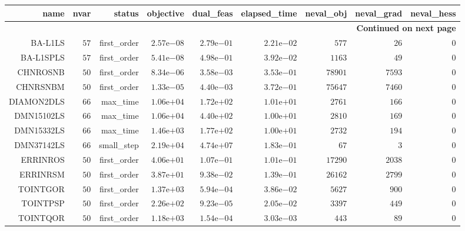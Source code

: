 \begin{longtable}{rrrrrrrrr}
\hline
name & nvar & status & objective & dual\_feas & elapsed\_time & neval\_obj & neval\_grad & neval\_hess \\\hline
\endhead
\hline
\multicolumn{9}{r}{{\bfseries Continued on next page}}\\
\hline
\endfoot
\endlastfoot
BA-L1LS & \(    57\) & first\_order & \( 2.57\)e\(-08\) & \( 2.79\)e\(-01\) & \( 2.21\)e\(-02\) & \(   577\) & \(    26\) & \(     0\) \\
BA-L1SPLS & \(    57\) & first\_order & \( 5.41\)e\(-08\) & \( 4.98\)e\(-01\) & \( 3.92\)e\(-02\) & \(  1163\) & \(    49\) & \(     0\) \\
CHNROSNB & \(    50\) & first\_order & \( 8.34\)e\(-06\) & \( 3.58\)e\(-03\) & \( 3.53\)e\(-01\) & \( 78901\) & \(  7593\) & \(     0\) \\
CHNRSNBM & \(    50\) & first\_order & \( 1.33\)e\(-05\) & \( 4.40\)e\(-03\) & \( 3.72\)e\(-01\) & \( 75647\) & \(  7460\) & \(     0\) \\
DIAMON2DLS & \(    66\) & max\_time & \( 1.06\)e\(+04\) & \( 1.72\)e\(+02\) & \( 1.01\)e\(+01\) & \(  2761\) & \(   166\) & \(     0\) \\
DMN15102LS & \(    66\) & max\_time & \( 1.06\)e\(+04\) & \( 4.40\)e\(+02\) & \( 1.00\)e\(+01\) & \(  2810\) & \(   169\) & \(     0\) \\
DMN15332LS & \(    66\) & max\_time & \( 1.46\)e\(+03\) & \( 1.77\)e\(+02\) & \( 1.00\)e\(+01\) & \(  2732\) & \(   194\) & \(     0\) \\
DMN37142LS & \(    66\) & small\_step & \( 2.19\)e\(+04\) & \( 4.74\)e\(+07\) & \( 1.83\)e\(-01\) & \(    67\) & \(     3\) & \(     0\) \\
ERRINROS & \(    50\) & first\_order & \( 4.06\)e\(+01\) & \( 1.07\)e\(-01\) & \( 1.01\)e\(-01\) & \( 17290\) & \(  2038\) & \(     0\) \\
ERRINRSM & \(    50\) & first\_order & \( 3.87\)e\(+01\) & \( 9.38\)e\(-02\) & \( 1.39\)e\(-01\) & \( 26162\) & \(  2799\) & \(     0\) \\
TOINTGOR & \(    50\) & first\_order & \( 1.37\)e\(+03\) & \( 5.94\)e\(-04\) & \( 3.86\)e\(-02\) & \(  5627\) & \(   900\) & \(     0\) \\
TOINTPSP & \(    50\) & first\_order & \( 2.26\)e\(+02\) & \( 9.23\)e\(-05\) & \( 2.05\)e\(-02\) & \(  3397\) & \(   449\) & \(     0\) \\
TOINTQOR & \(    50\) & first\_order & \( 1.18\)e\(+03\) & \( 1.54\)e\(-04\) & \( 3.03\)e\(-03\) & \(   443\) & \(    89\) & \(     0\) \\\hline
\end{longtable}
